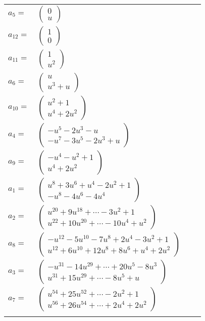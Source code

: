 \documentclass[1p]{elsarticle_modified}
\theoremstyle{definition}
\begin{document}
\begin{tabular}{m{7pt} m{180pt} m{7pt} m{180pt} }
\flushright $a_{5}=$&$\begin{pmatrix}0\\u\end{pmatrix}$ \\
\flushright $a_{12}=$&$\begin{pmatrix}1\\0\end{pmatrix}$ \\
\flushright $a_{11}=$&$\begin{pmatrix}1\\u^2\end{pmatrix}$ \\
\flushright $a_{6}=$&$\begin{pmatrix}u\\u^3+u\end{pmatrix}$ \\
\flushright $a_{10}=$&$\begin{pmatrix}u^2+1\\u^4+2 u^2\end{pmatrix}$ \\
\flushright $a_{4}=$&$\begin{pmatrix}- u^5-2 u^3- u\\- u^7-3 u^5-2 u^3+u\end{pmatrix}$ \\
\flushright $a_{9}=$&$\begin{pmatrix}- u^4- u^2+1\\u^4+2 u^2\end{pmatrix}$ \\
\flushright $a_{1}=$&$\begin{pmatrix}u^8+3 u^6+u^4-2 u^2+1\\- u^8-4 u^6-4 u^4\end{pmatrix}$ \\
\flushright $a_{2}=$&$\begin{pmatrix}u^{20}+9 u^{18}+\cdots-3 u^2+1\\u^{22}+10 u^{20}+\cdots-10 u^4+u^2\end{pmatrix}$ \\
\flushright $a_{8}=$&$\begin{pmatrix}- u^{12}-5 u^{10}-7 u^8+2 u^4-3 u^2+1\\u^{12}+6 u^{10}+12 u^8+8 u^6+u^4+2 u^2\end{pmatrix}$ \\
\flushright $a_{3}=$&$\begin{pmatrix}- u^{31}-14 u^{29}+\cdots+20 u^5-8 u^3\\u^{31}+15 u^{29}+\cdots-8 u^5+u\end{pmatrix}$ \\
\flushright $a_{7}=$&$\begin{pmatrix}u^{54}+25 u^{52}+\cdots-2 u^2+1\\u^{56}+26 u^{54}+\cdots+2 u^4+2 u^2\end{pmatrix}$\\&\end{tabular}
\end{document}

